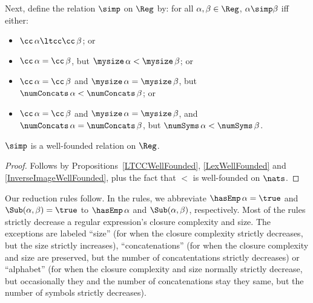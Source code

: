 Next, define the relation $\simp$ on $\Reg$ by: for all $\alpha,\beta\in
\Reg$, $\alpha\simp\beta$ iff either:
\begin{itemize}
\item $\cc\,\alpha\ltcc\cc\,\beta$; or

\item $\cc\,\alpha = \cc\,\beta$, but $\mysize\,\alpha < \mysize\,\beta$; or

\item $\cc\,\alpha = \cc\,\beta$ and $\mysize\,\alpha = \mysize\,\beta$,
  but $\numConcats\,\alpha < \numConcats\,\beta$; or

\item $\cc\,\alpha = \cc\,\beta$ and $\mysize\,\alpha =
  \mysize\,\beta$, and $\numConcats\,\alpha = \numConcats\,\beta$, but
  $\numSyms\,\alpha < \numSyms\,\beta$.
\end{itemize}

\begin{proposition}
$\simp$ is a well-founded relation on $\Reg$.
\end{proposition}

\begin{proof}
Follows by Propositions~\ref{LTCCWellFounded}, \ref{LexWellFounded}
and \ref{InverseImageWellFounded}, plus the fact that $<$ is
well-founded on $\nats$.
\end{proof}

Our reduction rules follow.  In the rules, we abbreviate
$\hasEmp\,\alpha=\true$ and $\Sub(\alpha,\beta)=\true$ to
$\hasEmp\,\alpha$ and $\Sub(\alpha,\beta)$, respectively.  Most of
the rules strictly decrease a regular expression's closure complexity
and size.  The exceptions are labeled ``size'' (for when the closure
complexity strictly decreases, but the size strictly increases),
``concatenations'' (for when the closure complexity and size are
preserved, but the number of concatentations strictly decreases) or
``alphabet'' (for when the closure complexity and size normally strictly
decrease, but occasionally they and the number of concatenations stay
they same, but the number of symbols strictly decreases).


